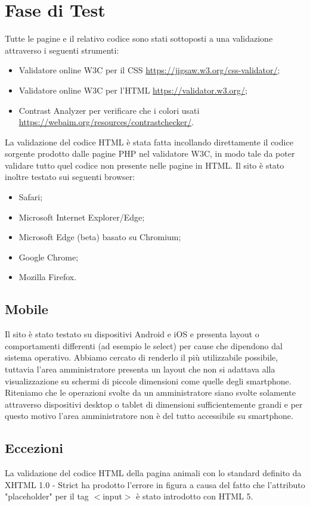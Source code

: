 \section{Fase di Test}
Tutte le pagine e il relativo codice sono stati sottoposti a una validazione attraverso i seguenti strumenti:
    \begin{itemize}
        \item Validatore online W3C per il CSS \url{https://jigsaw.w3.org/css-validator/};
        \item Validatore online W3C per l'HTML \url{https://validator.w3.org/};
        \item Contrast Analyzer per verificare che i colori usati \url{https://webaim.org/resources/contrastchecker/}.
    \end{itemize}
    La validazione del codice HTML è stata fatta incollando direttamente il codice sorgente prodotto dalle pagine PHP nel validatore W3C, in modo tale da poter validare tutto quel codice non presente nelle pagine in HTML.
    Il sito è stato inoltre testato sui seguenti browser:
    \begin{itemize}
        \item Safari;
        \item Microsoft Internet Explorer/Edge;
        \item Microsoft Edge (beta) basato su Chromium;
        \item Google Chrome;
        \item Mozilla Firefox.
    \end{itemize}
        \subsection{Mobile}
        Il sito è stato testato su dispositivi Android e iOS e presenta layout o comportamenti differenti (ad esempio le select) per cause che dipendono dal sistema operativo. Abbiamo cercato di renderlo il più utilizzabile possibile, tuttavia l'area amministratore presenta un layout che non si adattava alla visualizzazione su schermi di piccole dimensioni come quelle degli smartphone. Riteniamo che le operazioni svolte da un amministratore siano svolte solamente attraverso dispositivi desktop o tablet di dimensioni sufficientemente grandi e per questo motivo l'area amministratore non è del tutto accessibile su smartphone.

	\subsection{Eccezioni}
	La validazione del codice HTML della pagina animali con lo standard definito da XHTML 1.0 - Strict ha prodotto l'errore in figura a causa del fatto che l'attributo "placeholder" per il tag $<$input$>$ è stato introdotto con HTML 5.\\
	
